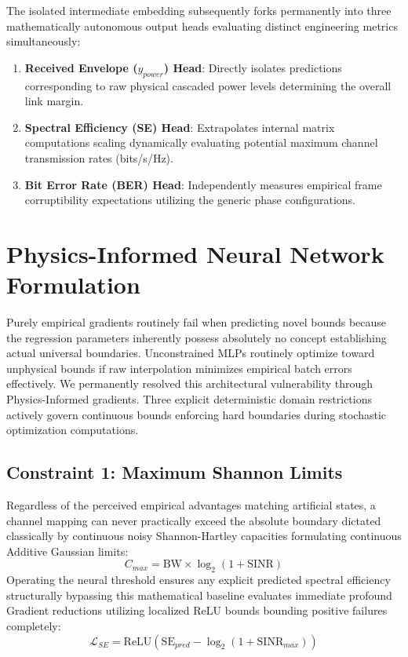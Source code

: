 \documentclass[conference]{IEEEtran}
\begin{document}
The isolated intermediate embedding subsequently forks permanently into three mathematically autonomous output heads evaluating distinct engineering metrics simultaneously:
\begin{enumerate}
    \item \textbf{Received Envelope ($y_{power}$) Head}: Directly isolates predictions corresponding to raw physical cascaded power levels determining the overall link margin. 
    \item \textbf{Spectral Efficiency (SE) Head}: Extrapolates internal matrix computations scaling dynamically evaluating potential maximum channel transmission rates (bits/s/Hz).
    \item \textbf{Bit Error Rate (BER) Head}: Independently measures empirical frame corruptibility expectations utilizing the generic phase configurations.
\end{enumerate}

\section{Physics-Informed Neural Network Formulation}

Purely empirical gradients routinely fail when predicting novel bounds because the regression parameters inherently possess absolutely no concept establishing actual universal boundaries. Unconstrained MLPs routinely optimize toward unphysical bounds if raw interpolation minimizes empirical batch errors effectively. We permanently resolved this architectural vulnerability through Physics-Informed gradients. Three explicit deterministic domain restrictions actively govern continuous bounds enforcing hard boundaries during stochastic optimization computations.

\subsection{Constraint 1: Maximum Shannon Limits}
Regardless of the perceived empirical advantages matching artificial states, a channel mapping can never practically exceed the absolute boundary dictated classically by continuous noisy Shannon-Hartley capacities formulating continuous Additive Gaussian limits:
\begin{equation}
C_{max} = \text{BW} \times \log_2\left(1 + \text{SINR}\right)
\end{equation}
Operating the neural threshold ensures any explicit predicted spectral efficiency structurally bypassing this mathematical baseline evaluates immediate profound Gradient reductions utilizing localized ReLU bounds bounding positive failures completely:
\begin{equation}
\mathcal{L}_{SE} = \text{ReLU}\left( \text{SE}_{pred} - \log_2(1 + \text{SINR}_{max}) \right)
\end{equation}
\end{document}
